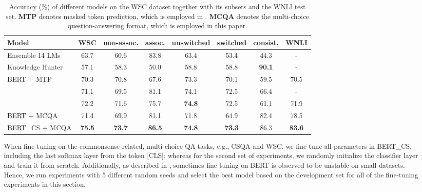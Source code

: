 \documentclass[11pt,a4paper]{article}
\begin{document}
\begin{table*}[t!]
	\begin{center}
		\small
		\begin{tabular}{p{3.4cm}|c|c|c|c|c|c|c}
			\toprule
            \textbf{Model}                        & \textbf{WSC}   & \textbf{non-assoc.} & \textbf{assoc.}        & \textbf{unswitched} & \textbf{switched} & \textbf{consist.} & \textbf{WNLI} \\
            \midrule
            Ensemble 14 LMs                  & 63.7 & 60.6      & 83.8& 63.4 & 53.4     & 44.3     & -    \\
            \midrule
            Knowledge Hunter             & 57.1 & 58.3      & 50.0           & 58.8       &58.8     & \textbf{90.1}     & -    \\
            \midrule
            BERT + MTP         & 70.3 & 70.8      & 67.6         & 73.3       &70.1     & 59.5& 70.5 \\
            \midrule
            \citet{ruan2019exploring}     & 71.1 & 69.5 & 81.1& 74.1 & 72.5 & 66.4 & - \\
            \midrule
            \citet{kocijan2019surprisingly} & 72.2 & 71.6 & 75.7 & \textbf{74.8} & 72.5 & 61.1 & 71.9 \\
            \bottomrule
            \toprule
            BERT + MCQA       & 71.4 & 69.9 & 81.1 & 71.8 & 64.9 & 82.4& 78.5 \\
            \midrule
            BERT\_CS + MCQA   & \textbf{75.5} & \textbf{73.7} & \textbf{86.5}&\textbf{74.8} & \textbf{73.3} & 86.3 & \textbf{83.6} \\
			\bottomrule
		\end{tabular}
	\end{center}
	\caption{Accuracy (\%) of different models on the WSC dataset together with its subsets and the WNLI test set. 
	\textbf{MTP} denotes masked token prediction, which is employed in \citet{kocijan2019surprisingly}.
	\textbf{MCQA} denotes the multi-choice question-answering format, which is employed in this paper.}
	\label{tab:WSC_results}
\end{table*}

When fine-tuning on the commonsense-related, multi-choice QA tasks, e.g., CSQA and WSC, 
we fine-tune all parameters in BERT\_CS, including the last softmax layer from the token [CLS]; whereas for the second set of experiments, we randomly initialize the classifier layer and train it from scratch. Additionally, as described in \citet{devlin-etal-2019-bert}, sometimes fine-tuning on BERT is observed to be unstable on small datasets. Hence, we run experiments with 5 different random seeds and select the best model based on the development set for all of the fine-tuning experiments in this section.
\end{document}
